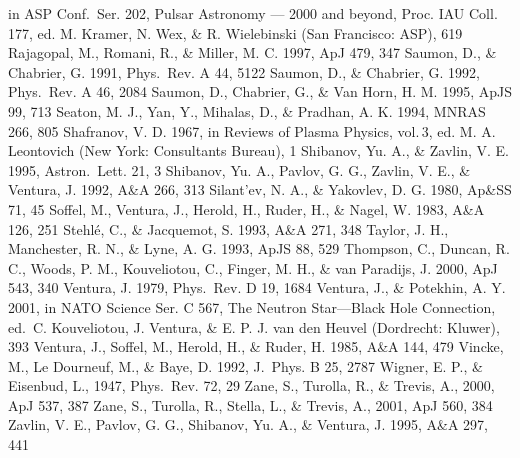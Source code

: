 \documentclass{emulateapj}
\begin{document}
\begin{thebibliography}{}
in      ASP Conf.\ Ser. 202,
Pulsar Astronomy --- 2000 and beyond, Proc. IAU Coll. 177,
 ed. M. Kramer, N. Wex, \& R. Wielebinski
      (San Francisco: ASP), 619
%
Rajagopal, M., Romani, R., \& Miller, M. C. 1997,
ApJ 479, 347
%
Saumon, D., \& Chabrier, G. 1991,
Phys.\ Rev. A 44, 5122
%
Saumon, D., \& Chabrier, G. 1992,
Phys.\ Rev. A 46, 2084
%
Saumon, D., Chabrier, G., \& Van Horn, H. M. 1995,
ApJS 99, 713
%
Seaton, M. J., Yan, Y., Mihalas, D., \& Pradhan, A. K. 1994,
MNRAS 266, 805
%
Shafranov, V. D. 1967,
in Reviews of Plasma Physics, vol.\,3,
ed. M. A. Leontovich
(New York: Consultants Bureau), 1
%
Shibanov, Yu. A., \& Zavlin, V. E. 1995,
Astron.\ Lett. 21, 3
%
Shibanov, Yu. A., Pavlov, G. G., Zavlin, V. E., \& Ventura, J.
1992, A\&A 266, 313
%
Silant'ev, N. A., \& Yakovlev, D. G. 1980,
Ap\&SS 71, 45
%
Soffel, M., Ventura, J., Herold, H., Ruder, H., \& Nagel, W. 1983,
A\&A 126, 251
%
Stehl\'e, C., \& Jacquemot, S. 1993,
A\&A 271, 348
%
Taylor, J. H., Manchester, R. N., \& Lyne, A. G. 1993, ApJS 88, 529
%
Thompson, C., Duncan, R. C., Woods, P. M., 
Kouveliotou, C., Finger, M. H., \& van Paradijs, J. 2000,
ApJ 543, 340
%
Ventura, J. 1979,
Phys.\ Rev. D 19, 1684
%
Ventura, J., \& Potekhin, A. Y. 2001,
in NATO Science Ser. C 567,
The Neutron Star---Black Hole Connection,
ed.\ C. Kouveliotou, J. Ventura, \& E. P. J. van den Heuvel
     (Dordrecht: Kluwer), 393 
%
Ventura, J., Soffel, M., Herold, H., \& Ruder, H. 1985,
A\&A 144, 479
%
Vincke, M., Le Dourneuf, M., \& Baye, D. 1992,
J.\ Phys. B 25, 2787
%
Wigner, E. P., \& Eisenbud, L., 1947,
Phys.\ Rev. 72, 29
%
Zane, S., Turolla, R., \& Trevis, A., 2000,
ApJ 537, 387
%
Zane, S., Turolla, R., Stella, L., \& Trevis, A., 2001,
ApJ 560, 384
%
Zavlin, V. E., Pavlov, G. G., Shibanov, Yu. A., \& Ventura, J. 1995,
A\&A 297, 441
%
\end{thebibliography} 
\end{document}
